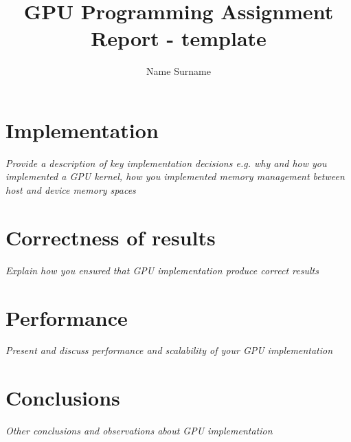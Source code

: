 \documentclass[a4paper, 11pt]{article}
\title{GPU Programming Assignment Report - template}
\author{Name Surname}
\begin{document}
\maketitle
	
\section{Implementation}
\it{Provide a description of key implementation decisions e.g. why and how you implemented a GPU kernel, how you implemented memory management between host and device memory spaces} 

\section{Correctness of results}
\it{Explain how you ensured that GPU implementation produce correct results}	

\section{Performance}
\it{Present and discuss performance and scalability of your GPU implementation}

\section{Conclusions}
\it{Other conclusions and observations about GPU implementation}
\end{document}
